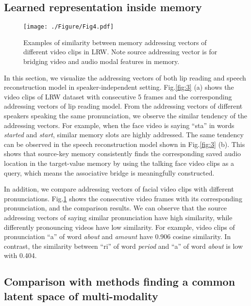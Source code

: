 \documentclass[10pt,twocolumn,letterpaper]{article}
\begin{document}
\subsection{Learned representation inside memory} 
\label{sec:4.3}
\begin{figure}[t!]
	\begin{minipage}[b]{1.0\linewidth}
		\centering
		\centerline{\texttt{[image: ./Figure/Fig4.pdf]}}
	\end{minipage}
	\caption{Examples of similarity between memory addressing vectors of different video clips in LRW. Note source addressing vector is for bridging video and audio modal features in memory.}
	\label{fig:4}
	\vspace{-0.5cm}
\end{figure}


In this section, we visualize the addressing vectors of both lip reading and speech reconstruction model in speaker-independent setting. Fig.\ref{fig:3} (a) shows the video clips of LRW dataset with consecutive 5 frames and the corresponding addressing vectors of lip reading model. From the addressing vectors of different speakers speaking the same pronunciation, we observe the similar tendency of the addressing vectors. For example, when the face video is saying ``sta'' in words \textit{started} and \textit{start}, similar memory slots are highly addressed. The same tendency can be observed in the speech reconstruction model shown in Fig.\ref{fig:3} (b). This shows that source-key memory consistently finds the corresponding saved audio location in the target-value memory by using the talking face video clips as a query, which means the associative bridge is meaningfully constructed.

In addition, we compare addressing vectors of facial video clips with different pronunciations. Fig.\ref{fig:4} shows the consecutive video frames with its corresponding pronunciation, and the comparison results. We can observe that the source addressing vectors of saying similar pronunciation have high similarity, while differently pronouncing videos have low similarity. For example, video clips of pronunciation ``a\textipa{\textupsilon}'' of word \textit{about} and \textit{amount} have 0.906 cosine similarity. In contrast, the similarity between ``ri'' of word \textit{period} and ``a\textipa{\textupsilon}'' of word \textit{about} is low with 0.404.

\subsection{Comparison with methods finding a common latent space of multi-modality} 
\label{sec:4.4}
\end{document}
